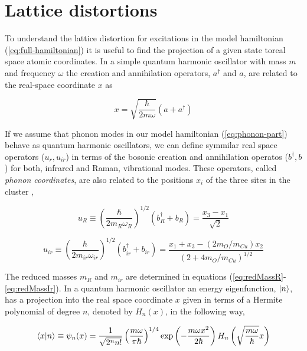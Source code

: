 \section{Lattice distortions}

To understand the lattice distortion for excitations in the model hamiltonian (\ref{eq:full-hamiltonian}) it is useful to find the projection of a given state toreal space atomic coordinates. 
In a simple quantum harmonic oscillator with mass $m$ and frequency $\omega$ the creation and annihilation operators, $a^\dagger$ and $a$, are related to the real-space coordinate $x$ as

\begin{equation}\label{eq:harmOscRel}
x=\sqrt{\frac{\hbar}{2m\omega}}\left(a+a^\dagger\right)
\end{equation}

If we assume that phonon modes in our model hamiltonian (\ref{eq:phonon-part}) behave as quantum harmonic oscillators, we can define symmilar real space operators ($u_r,u_{ir}$) in terms of the bosonic creation and annihilation operatos ($b^\dagger,b$) for both, infrared and Raman, vibrational modes. 
These operators, called \textit{phonon coordinates}, are also related to the positions $x_i$ of the three sites in the cluster \cite{MustredeLeon1992},

\begin{equation}\label{eq:uR}
u_R \equiv \left(\frac{\hbar}{2 m_R \omega_R}\right)^{1/2}(b_R^\dagger + b_R) = \frac{x_3 - x_1}{\sqrt{2}}
\end{equation}

\begin{equation}\label{eq:uir}
u_{ir} \equiv \left(\frac{\hbar}{2 m_{ir} \omega_{ir}}\right)^{1/2}(b^\dagger_{ir}+b_{ir}) = \frac{ x_1 + x_3 - ( 2 m_O/m_{Cu})x_2}{(2 + 4 m_O/m_{Cu})^{1/2}}
\end{equation}

The reduced masses $m_R$ and $m_{ir}$ are determined in equations (\ref{eq:redMassR}-\ref{eq:redMassIr}).
In a quantum harmonic oscillator an energy eigenfunction, $\left | n \right\rangle$, has a projection into the real space coordinate $x$ given in terms of a Hermite polynomial of degree $n$, denoted by $H_n(x)$, in the following way,

\begin{equation}\label{eq:harmOscProj}
\left\langle x|n\right\rangle 
\equiv \psi_n(x) 
= \frac{1}{\sqrt{2^n n!}} \left(\frac{m \omega}{\pi \hbar}\right)^{1/4}
  \exp\left(-\frac{m \omega x^2}{2 \hbar}\right) H_n\left( \sqrt{\frac{m \omega}{\hbar}} x \right) 
\end{equation}


